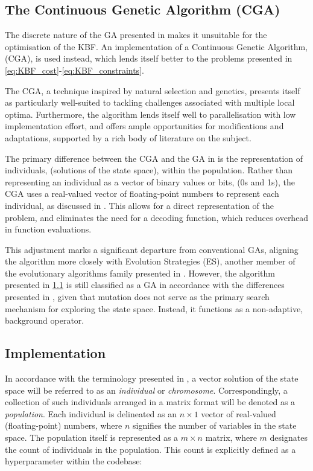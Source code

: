 \documentclass[10pt]{article}
\begin{document}
\begin{multicols}{2}
\section{The Continuous Genetic Algorithm (CGA)}
\label{sec:CGA}

The discrete nature of the GA presented in \cite{parks2023geneticalgorithms} makes it unsuitable for the optimisation of the KBF. An implementation of a Continuous Genetic Algorithm, (CGA), is used instead, which lends itself better to the problems presented in \ref{eq:KBF_cost}-\ref{eq:KBF_constraints}.

The CGA, a technique inspired by natural selection and genetics, presents itself as particularly well-suited to tackling challenges associated with multiple local optima. Furthermore, the algorithm lends itself well to parallelisation with low implementation effort, and offers ample opportunities for modifications and adaptations, supported by a rich body of literature on the subject.

The primary difference between the CGA and the GA in \cite{parks2023geneticalgorithms} is the representation of individuals, (solutions of the state space), within the population. Rather than representing an individual as a vector of binary values or bits, (0s and 1s), the CGA uses a real-valued vector of floating-point numbers to represent each individual, as discussed in \cite{PGA}. This allows for a direct representation of the problem, and eliminates the need for a decoding function, which reduces overhead in function evaluations.

This adjustment marks a significant departure from conventional GAs, aligning the algorithm more closely with Evolution Strategies (ES), another member of the evolutionary algorithms family presented in \cite{salimans2017evolution}. However, the algorithm presented in \ref{sec:CGA_implementation} is still classified as a GA in accordance with the differences presented in \cite{10.1007/BFb0029787}, given that mutation does not serve as the primary search mechanism for exploring the state space. Instead, it functions as a non-adaptive, background operator.

\subsection{Implementation}
\label{sec:CGA_implementation}

In accordance with the terminology presented in \cite{parks2023geneticalgorithms}, a vector solution of the state space will be referred to as an \textit{individual} or \textit{chromosome}. Correspondingly, a collection of such individuals arranged in a matrix format will be denoted as a \textit{population}. Each individual is delineated as an $n \times 1$ vector of real-valued (floating-point) numbers, where $n$ signifies the number of variables in the state space. The population itself is represented as a $m \times n$ matrix, where $m$ designates the count of individuals in the population. This count is explicitly defined as a hyperparameter within the codebase: %


\end{multicols}
\end{document}
